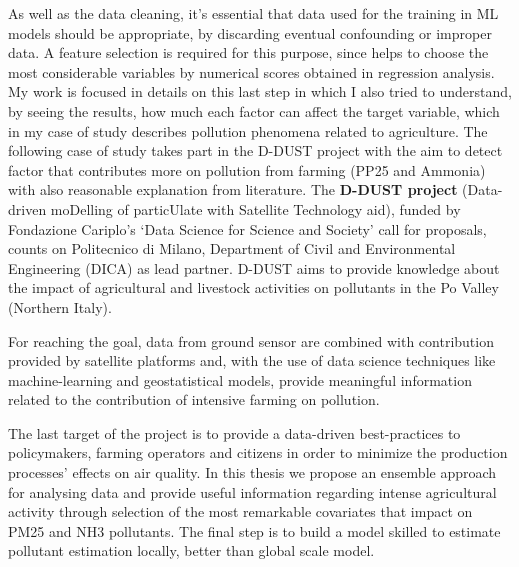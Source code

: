 As well as the data cleaning, it's essential that data used for the training in ML models should be appropriate, by discarding eventual confounding or improper data.
A feature selection is required for this purpose, since helps to choose the most considerable variables by numerical scores obtained in regression analysis.
My work is focused in details on this last step in which I also tried to understand, by seeing the results, how much each factor can affect the target variable, which in my case of study describes pollution phenomena related to agriculture.
The following case of study takes part in the D-DUST project with the aim to detect factor that contributes more on pollution from farming (PP25 and Ammonia) with also reasonable explanation from literature.
The \textbf{D-DUST project} (Data-driven moDelling of particUlate with Satellite Technology aid), funded by Fondazione Cariplo’s ‘Data Science for Science and Society’ call for proposals, counts on Politecnico di Milano, Department of Civil and Environmental Engineering (DICA) as lead partner.\newline
D-DUST aims to provide knowledge about the impact of agricultural and livestock activities on pollutants in the Po Valley (Northern Italy).\par 
For reaching the goal, data from ground sensor are combined with contribution provided by satellite platforms and, with the use of data science techniques like machine-learning and geostatistical models, provide meaningful information related to the contribution of intensive farming on pollution.\par
The last target of the project is to provide a data-driven best-practices to policymakers, farming operators and citizens in order to minimize the production processes' effects on air quality.
\bigskip
In this thesis we propose an ensemble approach for analysing data and provide useful information regarding intense agricultural activity through selection of the most remarkable covariates that impact on PM25 and NH3 pollutants. 
The final step is to build a model skilled to estimate pollutant estimation locally, better than global scale model.  